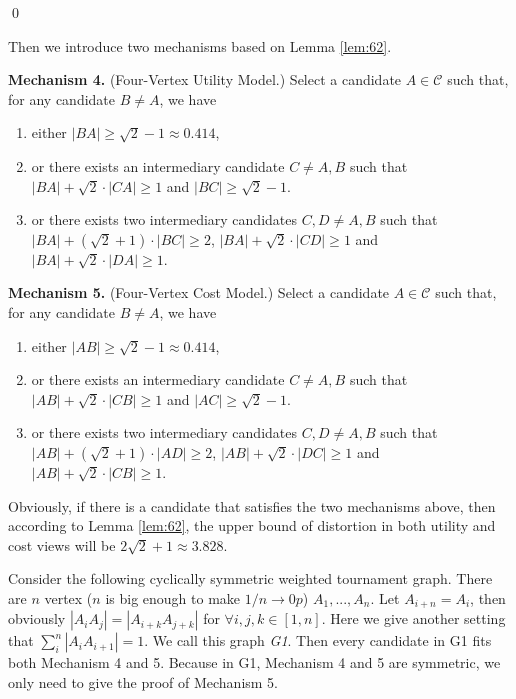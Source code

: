\documentclass[11pt]{article}
\theoremstyle{remark}
\begin{document}
\qed

Then we introduce two mechanisms based on Lemma \ref{lem:62}.

\vspace{2mm}\hspace{-3.5mm}\textbf{Mechanism 4.} {\sc(Four-Vertex Utility Model.)} Select a candidate $A\in \mathcal C$ such that, for any candidate $B\neq A$, we have
 \begin{enumerate}
 \item either $|BA|\ge \sqrt2-1 \approx 0.414$,
 \item or there exists an intermediary candidate $C\ne A,B$ such that $|BA| + \sqrt2 \cdot |CA|\ge 1$ and $|BC|\ge \sqrt2-1$.
 \item or there exists two intermediary candidates $C, D\ne A, B$ such that $|BA|+(\sqrt2+1)\cdot|BC|\ge 2$, $|BA| + \sqrt2\cdot |CD| \ge 1$ and $|BA| + \sqrt2\cdot |DA|\ge1$.
 \end{enumerate}

\vspace{2mm}\hspace{-3.5mm}\textbf{Mechanism 5.} {\sc(Four-Vertex Cost Model.)} Select a candidate $A\in \mathcal C$ such that, for any candidate $B\neq A$, we have
 \begin{enumerate}
 \item either $|AB|\ge \sqrt2-1 \approx 0.414$,
 \item or there exists an intermediary candidate $C\ne A,B$ such that $|AB| + \sqrt2 \cdot |CB|\ge 1$ and $|AC|\ge \sqrt2-1$.
 \item or there exists two intermediary candidates $C, D\ne A, B$ such that $|AB|+(\sqrt2+1)\cdot|AD|\ge 2$, $|AB| + \sqrt2\cdot |DC| \ge 1$ and $|AB| + \sqrt2\cdot |CB|\ge1$.
 \end{enumerate}

Obviously, if there is a candidate that satisfies the two mechanisms above, then according to Lemma \ref{lem:62}, the upper bound of distortion in both utility and cost views will be $2\sqrt2+1\approx 3.828$.

Consider the following cyclically symmetric weighted tournament graph. There are $n$ vertex ($n$ is big enough to make $1/n\rightarrow 0p$) $A_1, ..., A_n$. Let $A_{i+n}=A_i$, then obviously $|A_iA_j| = |A_{i+k}A_{j+k}|$ for $\forall i, j, k \in [1, n]$. Here we give another setting that $\sum_{i}^{n}{|A_{i}A_{i+1}|} = 1$. We call this graph \emph{G1}. Then every candidate in G1 fits both Mechanism 4 and 5. Because in G1, Mechanism 4 and 5 are symmetric, we only need to give the proof of Mechanism 5.
\end{document}
